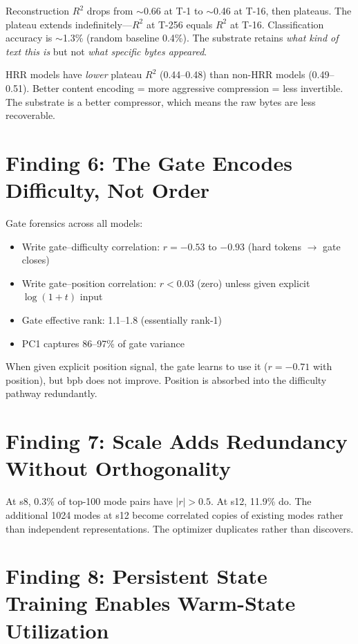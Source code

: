 \documentclass[11pt,a4paper]{article}
\begin{document}
Reconstruction $R^2$ drops from $\sim$0.66 at T-1 to $\sim$0.46 at T-16, then plateaus. The plateau extends indefinitely---$R^2$ at T-256 equals $R^2$ at T-16. Classification accuracy is $\sim$1.3\% (random baseline 0.4\%). The substrate retains \emph{what kind of text this is} but not \emph{what specific bytes appeared}.

HRR models have \emph{lower} plateau $R^2$ (0.44--0.48) than non-HRR models (0.49--0.51). Better content encoding = more aggressive compression = less invertible. The substrate is a better compressor, which means the raw bytes are less recoverable.

\section{Finding 6: The Gate Encodes Difficulty, Not Order}

Gate forensics across all models:
\begin{itemize}
\item Write gate--difficulty correlation: $r = -0.53$ to $-0.93$ (hard tokens $\to$ gate closes)
\item Write gate--position correlation: $r < 0.03$ (zero) unless given explicit $\log(1+t)$ input
\item Gate effective rank: 1.1--1.8 (essentially rank-1)
\item PC1 captures 86--97\% of gate variance
\end{itemize}

When given explicit position signal, the gate learns to use it ($r = -0.71$ with position), but bpb does not improve. Position is absorbed into the difficulty pathway redundantly.

\section{Finding 7: Scale Adds Redundancy Without Orthogonality}

At s8, 0.3\% of top-100 mode pairs have $|r| > 0.5$. At s12, 11.9\% do. The additional 1024 modes at s12 become correlated copies of existing modes rather than independent representations. The optimizer duplicates rather than discovers.

\section{Finding 8: Persistent State Training Enables Warm-State Utilization}
\end{document}

